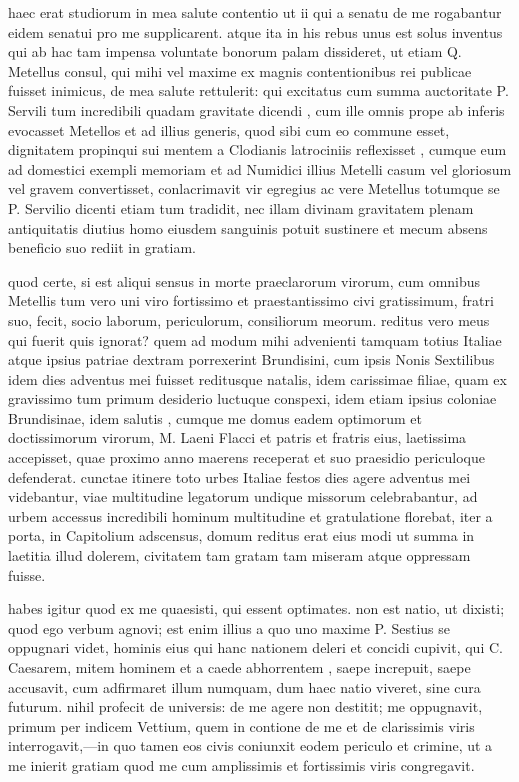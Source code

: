  haec erat studiorum in mea salute contentio ut ii qui a senatu de me rogabantur eidem senatui pro me supplicarent. atque ita in his rebus unus est solus inventus qui ab hac tam impensa voluntate bonorum palam dissideret, ut etiam Q. Metellus consul, qui mihi vel maxime ex magnis contentionibus rei publicae fuisset inimicus, de mea salute rettulerit: qui excitatus cum summa auctoritate P. Servili tum incredibili quadam gravitate dicendi , cum ille omnis prope ab inferis evocasset Metellos et ad illius generis, quod sibi cum eo commune esset, dignitatem propinqui sui mentem a Clodianis latrociniis reflexisset , cumque eum ad domestici exempli memoriam et ad Numidici illius Metelli casum vel gloriosum vel gravem convertisset, conlacrimavit vir egregius ac vere Metellus totumque se P. Servilio dicenti etiam tum tradidit, nec illam divinam gravitatem plenam antiquitatis diutius homo eiusdem sanguinis potuit sustinere et mecum absens beneficio suo rediit in gratiam.

 quod certe, si est aliqui sensus in morte praeclarorum virorum, cum omnibus Metellis tum vero uni viro fortissimo et praestantissimo civi gratissimum, fratri suo, fecit, socio laborum, periculorum, consiliorum meorum. reditus vero meus qui fuerit quis ignorat? quem ad modum mihi advenienti tamquam totius Italiae atque ipsius patriae dextram porrexerint Brundisini, cum ipsis Nonis Sextilibus idem dies adventus mei fuisset reditusque natalis, idem carissimae filiae, quam ex gravissimo tum primum desiderio luctuque conspexi, idem etiam ipsius coloniae Brundisinae, idem salutis , cumque me domus eadem optimorum et doctissimorum virorum, M. Laeni Flacci et patris et fratris eius, laetissima accepisset, quae proximo anno maerens receperat et suo praesidio periculoque defenderat. cunctae itinere toto urbes Italiae festos dies agere adventus mei videbantur, viae multitudine legatorum undique missorum celebrabantur, ad urbem accessus incredibili hominum multitudine et gratulatione florebat, iter a porta, in Capitolium adscensus, domum reditus erat eius modi ut summa in laetitia illud dolerem, civitatem tam gratam tam miseram atque oppressam fuisse.

 habes igitur quod ex me quaesisti, qui essent optimates. non est natio, ut dixisti; quod ego verbum agnovi; est enim illius a quo uno maxime P. Sestius se oppugnari videt, hominis eius qui hanc nationem deleri et concidi cupivit, qui C. Caesarem, mitem hominem et a caede abhorrentem , saepe increpuit, saepe accusavit, cum adfirmaret illum numquam, dum haec natio viveret, sine cura futurum. nihil profecit de universis: de me agere non destitit; me oppugnavit, primum per indicem Vettium, quem in contione de me et de clarissimis viris interrogavit,—in quo tamen eos civis coniunxit eodem periculo et crimine, ut a me inierit gratiam quod me cum amplissimis et fortissimis viris congregavit.

